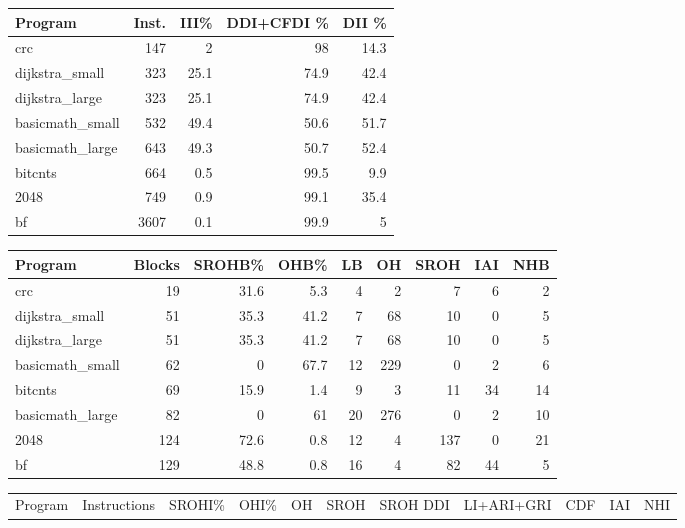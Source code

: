 \begin{tabular}{lrrrr}
\hline
 Program         &   Inst. &   III\% &   DDI+CFDI \% &   DII \% \\
\hline
 crc             &     147 &    2   &         98   &    14.3 \\
 dijkstra\_small  &     323 &   25.1 &         74.9 &    42.4 \\
 dijkstra\_large  &     323 &   25.1 &         74.9 &    42.4 \\
 basicmath\_small &     532 &   49.4 &         50.6 &    51.7 \\
 basicmath\_large &     643 &   49.3 &         50.7 &    52.4 \\
 bitcnts         &     664 &    0.5 &         99.5 &     9.9 \\
 2048            &     749 &    0.9 &         99.1 &    35.4 \\
 bf              &    3607 &    0.1 &         99.9 &     5   \\
\hline
\end{tabular}\begin{tabular}{lrrrrrrrr}
\hline
 Program         &   Blocks &   SROHB\% &   OHB\% &   LB &   OH &   SROH &   IAI &   NHB \\
\hline
 crc             &       19 &     31.6 &    5.3 &    4 &    2 &      7 &     6 &     2 \\
 dijkstra\_small  &       51 &     35.3 &   41.2 &    7 &   68 &     10 &     0 &     5 \\
 dijkstra\_large  &       51 &     35.3 &   41.2 &    7 &   68 &     10 &     0 &     5 \\
 basicmath\_small &       62 &      0   &   67.7 &   12 &  229 &      0 &     2 &     6 \\
 bitcnts         &       69 &     15.9 &    1.4 &    9 &    3 &     11 &    34 &    14 \\
 basicmath\_large &       82 &      0   &   61   &   20 &  276 &      0 &     2 &    10 \\
 2048            &      124 &     72.6 &    0.8 &   12 &    4 &    137 &     0 &    21 \\
 bf              &      129 &     48.8 &    0.8 &   16 &    4 &     82 &    44 &     5 \\
\hline
\end{tabular}\begin{tabular}{lrrrrrrrrrr}
\hline
 Program         &   Instructions &   SROHI\% &   OHI\% &   OH &   SROH &   SROH DDI &   LI+ARI+GRI &   CDF &   IAI &   NHI \\

\end{tabular}
